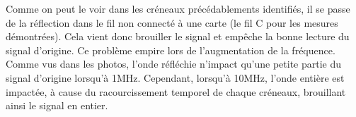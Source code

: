 Comme on peut le voir dans les créneaux précédablements identifiés, il se passe de la réflection dans le fil non connecté à une carte (le fil C pour les mesures démontrées).
Cela vient donc brouiller le signal et empêche la bonne lecture du signal d'origine. Ce problème empire lors de l'augmentation de la fréquence.
Comme vus dans les photos, l'onde réfléchie n'impact qu'une petite partie du signal d'origine lorsqu'à 1MHz. Cependant, lorsqu'à 10MHz, l'onde
entière est impactée, à cause du racourcissement temporel de chaque créneaux, brouillant ainsi le signal en entier.